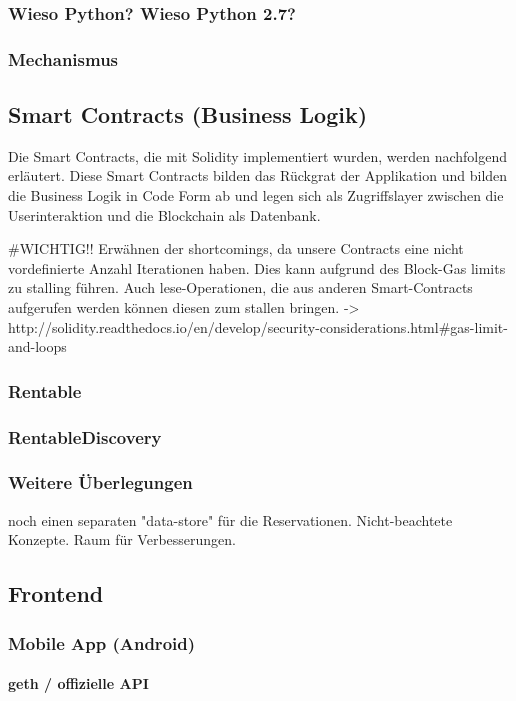 \subsubsection{Wieso Python? Wieso Python 2.7?}
\subsubsection{Mechanismus}

\subsection{Smart Contracts (Business Logik)}
Die Smart Contracts, die mit Solidity implementiert wurden, werden nachfolgend erläutert. Diese Smart Contracts bilden das Rückgrat der Applikation und bilden die Business Logik in Code Form ab und legen sich als Zugriffslayer zwischen die Userinteraktion und die Blockchain als Datenbank.

\#WICHTIG!!
Erwähnen der shortcomings, da unsere Contracts eine nicht vordefinierte Anzahl Iterationen haben. Dies kann aufgrund des Block-Gas limits zu stalling führen. Auch lese-Operationen, die aus anderen Smart-Contracts aufgerufen werden können diesen zum stallen bringen. -> http://solidity.readthedocs.io/en/develop/security-considerations.html\#gas-limit-and-loops

\subsubsection{Rentable}
\subsubsection{RentableDiscovery}

\subsubsection{Weitere Überlegungen}
noch einen separaten "data-store" für die Reservationen. Nicht-beachtete Konzepte. Raum für Verbesserungen.


\subsection{Frontend}
\subsubsection{Mobile App (Android)}
\paragraph{geth / offizielle API}
